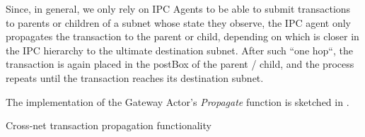 Since, in general, we only rely on IPC Agents to be able to submit transactions to parents or children of a subnet whose state they observe,
the IPC agent only propagates the transaction to the parent or child, depending on which is closer in the IPC hierarchy to the ultimate destination subnet.
After such ``one hop``, the transaction is again placed in the postBox of the parent / child, and the process repeats until the transaction reaches its destination subnet.

The implementation of the Gateway Actor's \emph{Propagate} function is sketched in .



\begin{algorithm}[H]
\footnotesize
\caption{Cross-net transaction propagation functionality}\label{alg:po}
  \DontPrintSemicolon
\end{algorithm}

